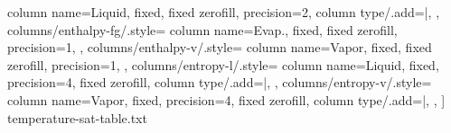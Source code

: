 \documentclass{article}
\begin{document}
\begin{center}
{            column name={Liquid},
            fixed,
            fixed zerofill,
            precision=2,
            column type/.add={|}{},
        },
        columns/enthalpy-fg/.style={
            column name={Evap.},
            fixed,
            fixed zerofill,
            precision=1,
        },
        columns/enthalpy-v/.style={
            column name={Vapor},
            fixed,
            fixed zerofill,
            precision=1,
        },
        columns/entropy-l/.style={
            column name={Liquid},
            fixed,
            precision=4,
            fixed zerofill,
            column type/.add={|}{},
        },
        columns/entropy-v/.style={
            column name={Vapor},
            fixed,
            precision=4,
            fixed zerofill,
            column type/.add={}{|},
        },
    ]
    {temperature-sat-table.txt}


\end{center}
\end{document}
